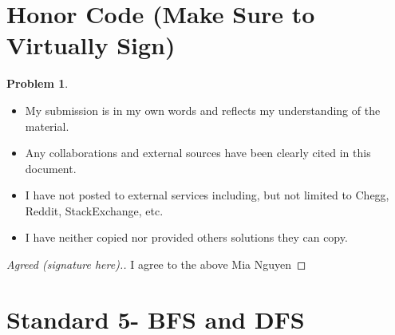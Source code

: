 \documentclass[11pt]{article}
\theoremstyle{definition}
\theoremstyle{definition}
\newtheorem{required}{Problem}
\theoremstyle{definition}
\begin{document}
\section{Honor Code (Make Sure to Virtually Sign)} \label{HonorCode}

\begin{required}
\begin{itemize}
\item My submission is in my own words and reflects my understanding of the material.
\item Any collaborations and external sources have been clearly cited in this document.
\item I have not posted to external services including, but not limited to Chegg, Reddit, StackExchange, etc.
\item I have neither copied nor provided others solutions they can copy.
\end{itemize}

\end{required}

\begin{proof}[Agreed (signature here).]
I agree to the above Mia Nguyen
\end{proof}


\newpage
\section{Standard 5- BFS and DFS}
\end{document}
